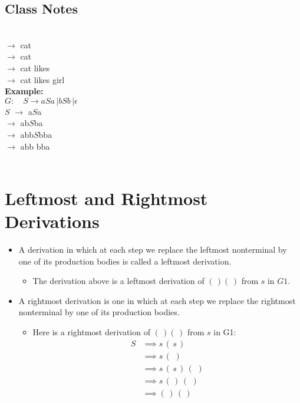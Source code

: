 \documentclass[]{article}
\begin{document}
\begin{enumerate}
  \subsection*{Class Notes}
     \\
    $\rightarrow$ cat                    \\
    $\rightarrow$ cat          \\
    $\rightarrow$ cat likes       \\
    $\rightarrow$ cat likes girl                   \\
    \textbf{Example:} \\
    $G: \quad S \rightarrow aSa \, | bSb \, | \epsilon$ \\
    $S$ $\rightarrow$ a$S$a     \\
        $\rightarrow$ ab$S$ba   \\
        $\rightarrow$ abb$S$bba \\
        $\rightarrow$ abb bba   \\ \\
        
\section{Leftmost and Rightmost Derivations}
  \begin{itemize}
    \item A derivation in which at each step we replace the leftmost nonterminal
    by one of its production bodies is called a leftmost derivation.
      \begin{itemize}
        \item The derivation above is a leftmost derivation of $(\,)(\,)$ from
        $s$ in $G1$.
      \end{itemize}
    \item A rightmost derivation is one in which at each step we replace the
    rightmost nonterminal by one of its production bodies.
      \begin{itemize}
        \item Here is a rightmost derivation of $(\,)(\,)$ from $s$ in G1:
          \begin{align*}
            S & \implies s \, (\,s\,)            \\
              & \implies s \, (\,\,)             \\
              & \implies s \, (\,s\,) \, (\,\,)  \\
              & \implies s \, (\,   ) \, (\,\,)  \\
              & \implies      (\,   ) \, (\,   ) \\ 
          \end{align*}
      \end{itemize}
  \end{itemize}

\end{enumerate}
\end{document}
